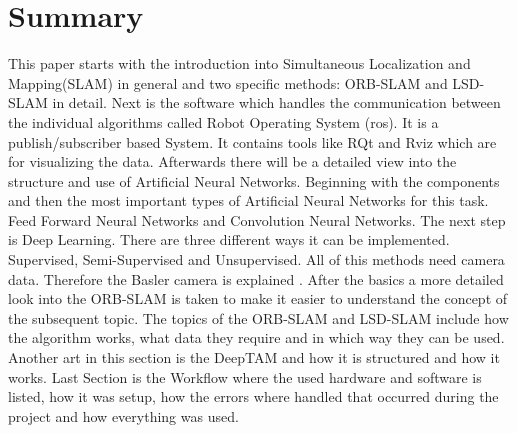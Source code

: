 

\chapter*{Summary}

This paper starts with the introduction into Simultaneous Localization and Mapping(SLAM) in general and two specific methods: ORB-SLAM and LSD-SLAM in detail. \newline
Next is the software which handles the communication between the individual algorithms called Robot Operating System (\gls{ros}). It is a publish/subscriber based System. It contains tools like RQt and Rviz which are for visualizing the data. Afterwards there will be a detailed view into the structure and use of Artificial Neural Networks. Beginning with the components and then the most important types of Artificial Neural Networks for this task. Feed Forward Neural Networks and Convolution Neural Networks. The next step is Deep Learning. There are three different ways it can be implemented. Supervised, Semi-Supervised and Unsupervised. All of this methods need camera data. Therefore the Basler camera is explained . \newline
After the basics a more detailed look into the ORB-SLAM is taken to make it easier to understand the concept of the subsequent topic. The topics of the ORB-SLAM and LSD-SLAM include how the algorithm works, what data they require and in which way they can be used. Another art in this section is the DeepTAM and how it is structured and how it works. \newline
Last Section is the Workflow where the used hardware and software is listed, how it was setup, how the errors where handled that occurred during the project and how everything was used.